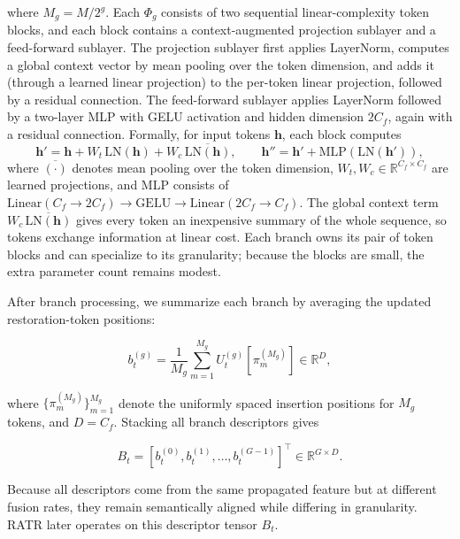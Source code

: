 where $M_g = M/2^g$. Each $\Phi_g$ consists of two sequential linear-complexity token blocks, and each block contains a context-augmented projection sublayer and a feed-forward sublayer. The projection sublayer first applies LayerNorm, computes a global context vector by mean pooling over the token dimension, and adds it (through a learned linear projection) to the per-token linear projection, followed by a residual connection. The feed-forward sublayer applies LayerNorm followed by a two-layer MLP with GELU activation and hidden dimension $2C_f$, again with a residual connection. Formally, for input tokens $\mathbf{h}$, each block computes
\begin{equation}
\mathbf{h}' = \mathbf{h} + W_t\,\mathrm{LN}(\mathbf{h}) + W_c\,\overline{\mathrm{LN}(\mathbf{h})},\qquad
\mathbf{h}'' = \mathbf{h}' + \mathrm{MLP}(\mathrm{LN}(\mathbf{h}')),
\end{equation}
where $\overline{(\cdot)}$ denotes mean pooling over the token dimension, $W_t,W_c\in\mathbb{R}^{C_f\times C_f}$ are learned projections, and MLP consists of $\mathrm{Linear}(C_f\!\rightarrow\!2C_f)\!\rightarrow\!\mathrm{GELU}\!\rightarrow\!\mathrm{Linear}(2C_f\!\rightarrow\!C_f)$. The global context term $W_c\,\overline{\mathrm{LN}(\mathbf{h})}$ gives every token an inexpensive summary of the whole sequence, so tokens exchange information at linear cost. Each branch owns its pair of token blocks and can specialize to its granularity; because the blocks are small, the extra parameter count remains modest.

After branch processing, we summarize each branch by averaging the updated restoration-token positions:

\begin{equation}
b_t^{(g)} =
\frac{1}{M_g}
\sum_{m=1}^{M_g}
U_t^{(g)}[\pi_m^{(M_g)}]
\in \mathbb{R}^{D},
\end{equation}

where $\{\pi_m^{(M_g)}\}_{m=1}^{M_g}$ denote the uniformly spaced insertion positions for $M_g$ tokens, and $D=C_f$. Stacking all branch descriptors gives

\begin{equation}
B_t =
\left[
b_t^{(0)}, b_t^{(1)}, \ldots, b_t^{(G-1)}
\right]^\top
\in \mathbb{R}^{G \times D}.
\end{equation}

Because all descriptors come from the same propagated feature but at different fusion rates, they remain semantically aligned while differing in granularity. RATR later operates on this descriptor tensor $B_t$.

